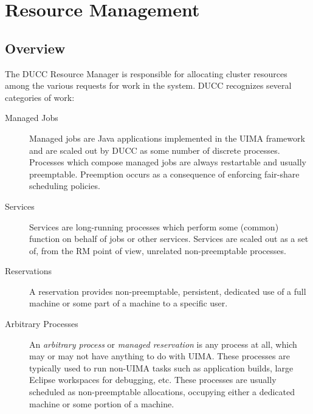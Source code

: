 % 
% 
% 
% 
\ifpdf
\else
{}
\fi
\chapter{Resource Management}
\label{chap:rm}
    \section{Overview}

    The DUCC Resource Manager is responsible for allocating cluster resources among the various 
    requests for work in the system. DUCC recognizes several categories of work: 

    \begin{description}
        \item[Managed Jobs]
            Managed jobs are Java applications implemented in the UIMA framework
            and are scaled out by DUCC as some number of discrete processes.  Processes which 
            compose managed jobs are always restartable and usually preemptable.  Preemption
            occurs as a consequence of enforcing fair-share scheduling policies.

        \item[Services]
            Services are long-running processes which perform some (common) function on behalf of 
            jobs or other services.  Services are scaled out as a set of, from the RM point of view,
            unrelated non-preemptable processes.  

        \item[Reservations]
            A reservation provides non-preemptable, persistent, dedicated use of a full machine or
            some part of a machine to a specific user.

        \item[Arbitrary Processes]
            An {\em arbitrary process} or {\em managed reservation} is any process at all, which may
            or may not have anything to do with UIMA.  These processes are typically used to
            run non-UIMA tasks such as application builds, large Eclipse workspaces for debugging,
            etc. These processes are usually scheduled as non-preemptable allocations,
            occupying either a dedicated machine or some portion of a machine.

    \end{description}
          
